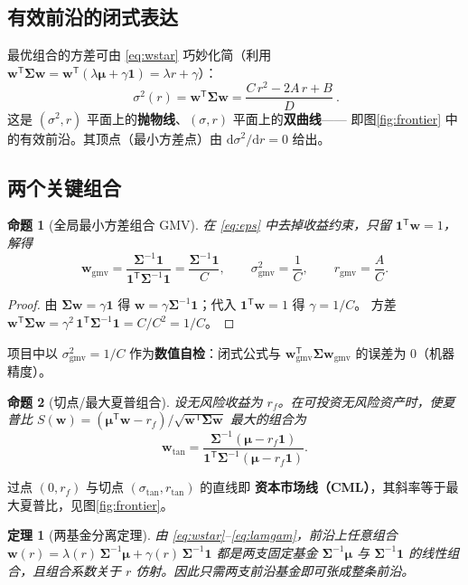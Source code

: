 \documentclass[12pt]{ctexart}
\newcommand{\w}{\bm{w}}
\newcommand{\muv}{\bm{\mu}}
\newcommand{\Sig}{\bm{\Sigma}}
\newcommand{\one}{\mathbf{1}}
\newcommand{\T}{^{\mathsf{T}}}
\newcommand{\Sinv}{\Sig^{-1}}
\theoremstyle{definition}
\theoremstyle{plain}
\newtheorem{theorem}{定理}
\newtheorem{proposition}{命题}
\begin{document}
\subsection{有效前沿的闭式表达}
最优组合的方差可由 \eqref{eq:wstar} 巧妙化简（利用 $\w\T\Sig\w=\w\T(\lambda\muv+\gamma\one)
=\lambda r+\gamma$）：
\begin{equation}
\boxed{\ \sigma^2(r)=\w\T\Sig\w=\frac{C\,r^2-2A\,r+B}{D}\ }.
\label{eq:frontier}
\end{equation}
这是 $(\sigma^2,r)$ 平面上的\textbf{抛物线}、$(\sigma,r)$ 平面上的\textbf{双曲线}——
即图\ref{fig:frontier} 中的有效前沿。其顶点（最小方差点）由 $\mathrm d\sigma^2/\mathrm dr=0$ 给出。

\subsection{两个关键组合}

\begin{proposition}[全局最小方差组合 GMV]
在 \eqref{eq:eps} 中去掉收益约束，只留 $\one\T\w=1$，解得
\begin{equation}
\w_{\mathrm{gmv}}=\frac{\Sinv\one}{\one\T\Sinv\one}=\frac{\Sinv\one}{C},\qquad
\sigma^2_{\mathrm{gmv}}=\frac1C,\qquad r_{\mathrm{gmv}}=\frac{A}{C}.
\end{equation}
\end{proposition}
\begin{proof}
由 $\Sig\w=\gamma\one$ 得 $\w=\gamma\Sinv\one$；代入 $\one\T\w=1$ 得 $\gamma=1/C$。
方差 $\w\T\Sig\w=\gamma^2\,\one\T\Sinv\one=C/C^2=1/C$。
\end{proof}
\noindent 项目中以 $\sigma^2_{\mathrm{gmv}}=1/C$ 作为\textbf{数值自检}：闭式公式与
$\w_{\mathrm{gmv}}\T\Sig\w_{\mathrm{gmv}}$ 的误差为 $0$（机器精度）。

\begin{proposition}[切点/最大夏普组合]
设无风险收益为 $r_f$。在可投资无风险资产时，使夏普比
$S(\w)=(\muv\T\w-r_f)/\sqrt{\w\T\Sig\w}$ 最大的组合为
\begin{equation}
\w_{\mathrm{tan}}=\frac{\Sinv(\muv-r_f\one)}{\one\T\Sinv(\muv-r_f\one)} .
\end{equation}
\end{proposition}
\noindent 过点 $(0,r_f)$ 与切点 $(\sigma_{\mathrm{tan}},r_{\mathrm{tan}})$ 的直线即
\textbf{资本市场线（CML）}，其斜率等于最大夏普比，见图\ref{fig:frontier}。

\begin{theorem}[两基金分离定理]
由 \eqref{eq:wstar}--\eqref{eq:lamgam}，前沿上任意组合
$\w(r)=\lambda(r)\,\Sinv\muv+\gamma(r)\,\Sinv\one$ 都是\emph{两支固定基金} $\Sinv\muv$
与 $\Sinv\one$ 的线性组合，且组合系数关于 $r$ 仿射。因此只需两支前沿基金即可张成整条前沿。
\end{theorem}
\end{document}
